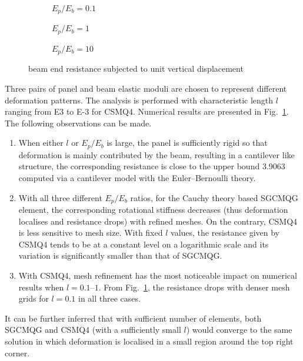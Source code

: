 \documentclass[3p,sort&compress,11pt,fleqn,review]{elsarticle}
\newcommand*{\alert}[1]{#1}
\newcommand*{\figref}[1]{Fig.~\ref{#1}}
\begin{document}
\begin{figure}[ht]
\centering\footnotesize
\begin{subfigure}[b]{.99\textwidth}\centering

\caption{$E_p/E_b=0.1$}
\end{subfigure}
\begin{subfigure}[b]{.99\textwidth}\centering

\caption{$E_p/E_b=1$}
\end{subfigure}
\begin{subfigure}[b]{.99\textwidth}\centering

\caption{$E_p/E_b=10$}
\end{subfigure}
\caption{beam end resistance subjected to unit vertical displacement}\label{fig:joint}
\end{figure}
Three pairs of panel and beam elastic moduli are chosen to represent different deformation patterns. The analysis is performed with characteristic length $l$ ranging from \num[print-unity-mantissa=false]{E3} to \num[print-unity-mantissa=false]{E-3} for CSMQ4. Numerical results are presented in \figref{fig:joint}. The following observations can be made.
\begin{enumerate}
\item When either $l$ or $E_p/E_b$ is large, the panel is sufficiently rigid so that deformation is mainly contributed by the beam, resulting in a cantilever like structure, the corresponding resistance is close to the upper bound \num{3.9063} computed via a cantilever model with the Euler--Bernoulli theory.
\item With all three different $E_p/E_b$ ratios, for the Cauchy theory based SGCMQG element, the corresponding rotational stiffness decreases (thus deformation localises and resistance drops) with refined meshes. On the contrary, CSMQ4 is less sensitive to mesh size. With fixed $l$ values, \alert{the resistance given by CSMQ4 tends to be at a constant level on a logarithmic scale and its variation} is significantly smaller than that of SGCMQG.
\item With CSMQ4, mesh refinement has the most noticeable impact on numerical results when $l=\numrange{0.1}{1}$. \alert{From \figref{fig:joint}, the resistance drops with denser mesh grids for $l=0.1$ in all three cases.}
\end{enumerate}

It can be further inferred that with sufficient number of elements, both SGCMQG and CSMQ4 (with a sufficiently small $l$) would converge to the same solution in which deformation is localised in a small region around the top right corner.
\end{document}
